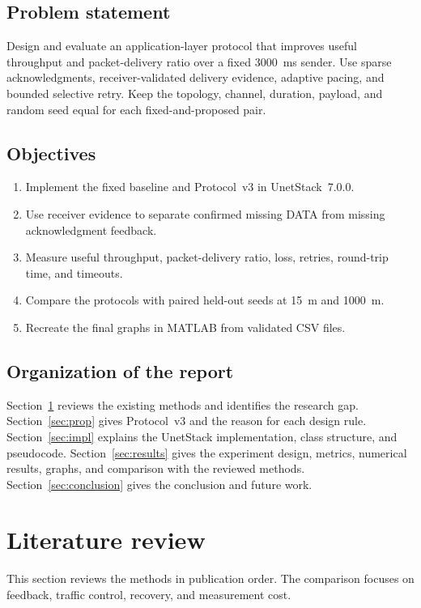 \documentclass[11pt]{article}
\begin{document}
\subsection{Problem statement}\label{sec:problem}
\noindent
Design and evaluate an application-layer protocol that improves useful throughput and packet-delivery ratio over a fixed 3000~ms sender.
Use sparse acknowledgments, receiver-validated delivery evidence, adaptive pacing, and bounded selective retry.
Keep the topology, channel, duration, payload, and random seed equal for each fixed-and-proposed pair.

\subsection{Objectives}\label{sec:objectives}
\begin{enumerate}\setlength{\itemsep}{2pt}
  \item Implement the fixed baseline and Protocol~v3 in UnetStack~7.0.0.
  \item Use receiver evidence to separate confirmed missing DATA from missing acknowledgment feedback.
  \item Measure useful throughput, packet-delivery ratio, loss, retries, round-trip time, and timeouts.
  \item Compare the protocols with paired held-out seeds at 15~m and 1000~m.
  \item Recreate the final graphs in MATLAB from validated CSV files.
\end{enumerate}

\subsection{Organization of the report}\label{sec:organization}
\noindent
Section~\ref{sec:lit} reviews the existing methods and identifies the research gap.
Section~\ref{sec:prop} gives Protocol~v3 and the reason for each design rule.
Section~\ref{sec:impl} explains the UnetStack implementation, class structure, and pseudocode.
Section~\ref{sec:results} gives the experiment design, metrics, numerical results, graphs, and comparison with the reviewed methods.
Section~\ref{sec:conclusion} gives the conclusion and future work.

\clearpage
\section{Literature review}\label{sec:lit}
\noindent
This section reviews the methods in publication order.
The comparison focuses on feedback, traffic control, recovery, and measurement cost.
\end{document}
